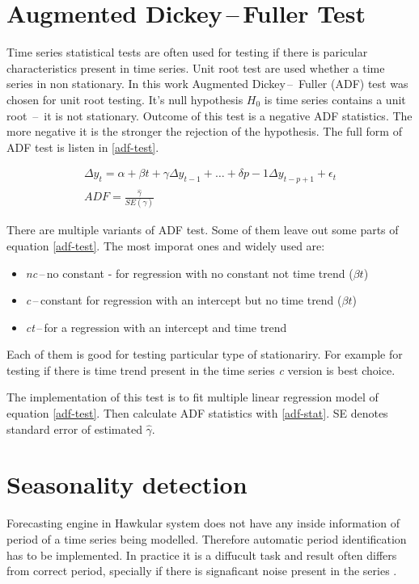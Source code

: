     \section{Augmented Dickey\,--\,Fuller Test}
    Time series statistical tests are often used for testing if there is paricular characteristics present in time
    series. Unit root test are used whether a time series in non stationary. In this work Augmented Dickey\,--\,
    Fuller (ADF) test was chosen for unit root testing. It's null hypothesis $H_0$ is time series contains a
    unit root \,--\, it is not stationary. Outcome of this test is a negative ADF statistics. The more negative it is
    the stronger the rejection of the hypothesis. The full form of ADF test is listen in \ref{adf-test}.

    \begin{eqnarray} \label{adf-test}
        \Delta y_t = \alpha + \beta t + \gamma \Delta y_{t-1} + \dots + \delta{p-1} \Delta y_{t-p+1} + \epsilon_t \\
        ADF = \frac{\hat{\gamma}}{SE(\hat{\gamma})} \label{adf-stat}
    \end{eqnarray}

    There are multiple variants of ADF test. Some of them leave out some parts of equation \ref{adf-test}.
    The most imporat ones and widely used are:

    \begin{itemize}
        \item \emph{nc}\,--\,no constant - for regression with no constant not time trend ($\beta t$)
        \item \emph{c}\,--\,constant for regression with an intercept but no time trend ($\beta t$)
        \item \emph{ct}\,--\,for a regression with an intercept and time trend
    \end{itemize}

    Each of them is good for testing particular type of stationariry. For example for testing if there is time trend
    present in the time series \emph{c} version is best choice.

    The implementation of this test is to fit multiple linear regression model of equation \ref{adf-test}. Then
    calculate ADF statistics with \ref{adf-stat}. SE denotes standard error of estimated $\hat{\gamma}$.

    \section{Seasonality detection}
    Forecasting engine in Hawkular system does not have any inside information of period of a time series being
    modelled. Therefore automatic period identification has to be implemented. In practice it is
    a diffucult task and result often differs from correct period, specially if there is signaficant noise present in
    the series \cite{period-meteo}.

